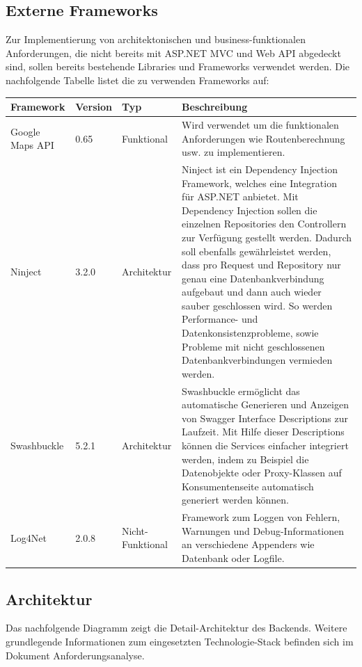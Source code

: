 \documentclass[a4paper,10pt,xetex]{article}
\begin{document}
\subsection[Externe Frameworks]{Externe Frameworks}

  Zur Implementierung von architektonischen und business-funktionalen Anforderungen, die nicht bereits mit ASP.NET MVC und
  Web API abgedeckt sind, sollen bereits bestehende Libraries und Frameworks verwendet werden. Die nachfolgende Tabelle
  listet die zu verwenden Frameworks auf:


\bigskip

\begin{longtabu} to \textwidth { | l | l | l | X[l] | }
  \hline
  \textbf{Framework} & \textbf{Version}  & \textbf{Typ} & \textbf{Beschreibung} \\
  \hline
  \endhead

    Google Maps API &
    0.65 &
    Funktional &
    Wird verwendet um die funktionalen Anforderungen wie Routenberechnung usw. zu
      implementieren.\\\hline
    Ninject &
    3.2.0 &
    Architektur &
    Ninject ist ein Dependency Injection Framework, welches eine Integration f\"ur ASP.NET
      anbietet. Mit Dependency Injection sollen die einzelnen Repositories den Controllern zur Verf\"ugung gestellt werden.
      Dadurch soll ebenfalls gew\"ahrleistet werden, dass pro Request und Repository nur genau eine Datenbankverbindung
      aufgebaut und dann auch wieder sauber geschlossen wird. So werden Performance- und Datenkonsistenzprobleme, sowie
      Probleme mit nicht geschlossenen Datenbankverbindungen vermieden werden.\\\hline
    Swashbuckle &
    5.2.1 &
    Architektur &
    Swashbuckle erm\"oglicht das automatische Generieren und Anzeigen von Swagger Interface
      Descriptions zur Laufzeit. Mit Hilfe dieser Descriptions k\"onnen die Services einfacher integriert werden, indem zu
      Beispiel die Datenobjekte oder Proxy-Klassen auf Konsumentenseite automatisch generiert werden k\"onnen.\\\hline
    Log4Net &
    2.0.8 &
    Nicht-Funktional &
    Framework zum Loggen von Fehlern, Warnungen und Debug-Informationen an verschiedene
      Appenders wie Datenbank oder Logfile.\\\hline
\end{longtabu}
\subsection[Architektur]{Architektur}
Das nachfolgende Diagramm zeigt die
    Detail-Architektur des Backends. Weitere grundlegende Informationen zum eingesetzten
    Technologie-Stack befinden sich im Dokument Anforderungsanalyse.
\end{document}
